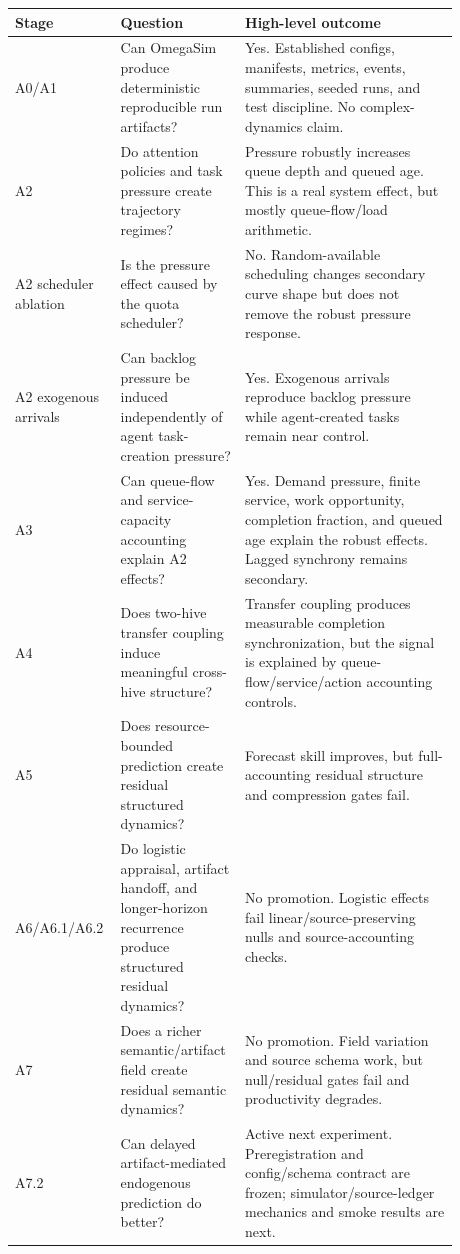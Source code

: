 \documentclass[11pt]{article}
\begin{document}
\begin{longtable}{p{0.16\linewidth}p{0.26\linewidth}p{0.46\linewidth}}
\hline
Stage & Question & High-level outcome \\
\hline
A0/A1 & Can OmegaSim produce deterministic reproducible run artifacts? &
Yes. Established configs, manifests, metrics, events, summaries, seeded runs,
and test discipline. No complex-dynamics claim. \\
\hline
A2 & Do attention policies and task pressure create trajectory regimes? &
Pressure robustly increases queue depth and queued age. This is a real system
effect, but mostly queue-flow/load arithmetic. \\
\hline
A2 scheduler ablation & Is the pressure effect caused by the quota scheduler? &
No. Random-available scheduling changes secondary curve shape but does not
remove the robust pressure response. \\
\hline
A2 exogenous arrivals & Can backlog pressure be induced independently of
agent task-creation pressure? & Yes. Exogenous arrivals reproduce backlog
pressure while agent-created tasks remain near control. \\
\hline
A3 & Can queue-flow and service-capacity accounting explain A2 effects? &
Yes. Demand pressure, finite service, work opportunity, completion fraction,
and queued age explain the robust effects. Lagged synchrony remains secondary. \\
\hline
A4 & Does two-hive transfer coupling induce meaningful cross-hive structure? &
Transfer coupling produces measurable completion synchronization, but the
signal is explained by queue-flow/service/action accounting controls. \\
\hline
A5 & Does resource-bounded prediction create residual structured dynamics? &
Forecast skill improves, but full-accounting residual structure and
compression gates fail. \\
\hline
A6/A6.1/A6.2 & Do logistic appraisal, artifact handoff, and longer-horizon
recurrence produce structured residual dynamics? & No promotion. Logistic
effects fail linear/source-preserving nulls and source-accounting checks. \\
\hline
A7 & Does a richer semantic/artifact field create residual semantic dynamics? &
No promotion. Field variation and source schema work, but null/residual gates
fail and productivity degrades. \\
\hline
A7.2 & Can delayed artifact-mediated endogenous prediction do better? &
Active next experiment. Preregistration and config/schema contract are frozen;
simulator/source-ledger mechanics and smoke results are next. \\
\hline
\end{longtable}
\end{document}

